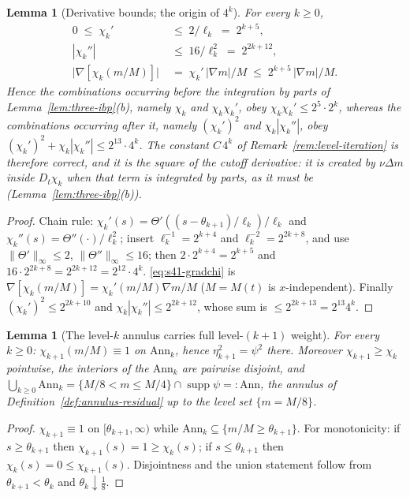 \documentclass[11pt]{article}
\newtheorem{lemma}[theorem]{Lemma}
\theoremstyle{definition}
\theoremstyle{remark}
\begin{document}
\begin{lemma}[Derivative bounds; the origin of $4^{k}$]\label{lem:s41-derivs}
  For every $k\geq0$,
  \begin{align}
    0\;\leq\;\chi_k' &\;\leq\; 2/\ell_k \;=\; 2^{k+5},
      \label{eq:s41-chip}\\
    |\chi_k''| &\;\leq\; 16/\ell_k^2 \;=\; 2^{2k+12},
      \label{eq:s41-chipp}\\
    \bigl|\nabla[\chi_k(m/M)]\bigr| &\;=\; \chi_k'\,|\nabla m|/M
      \;\leq\; 2^{k+5}\,|\nabla m|/M .
      \label{eq:s41-gradchi}
  \end{align}
  Hence the combinations occurring \emph{before} the integration by parts of
  Lemma~\ref{lem:three-ibp}(b), namely $\chi_k$ and $\chi_k\chi_k'$, obey
  $\chi_k\chi_k'\leq 2^{5}\cdot2^{k}$, whereas the combinations occurring
  \emph{after} it, namely $(\chi_k')^2$ and $\chi_k|\chi_k''|$, obey
  $(\chi_k')^2+\chi_k|\chi_k''|\leq 2^{13}\cdot4^{k}$. The constant
  $C\,4^{k}$ of Remark~\ref{rem:level-iteration} is therefore correct, and
  it is the \emph{square} of the cutoff derivative: it is created by
  $\nu\Delta m$ inside $D_t\chi_k$ when that term is integrated by parts, as
  it must be (Lemma~\ref{lem:three-ibp}(b)).
\end{lemma}
\begin{proof}
  Chain rule: $\chi_k'(s)=\Theta'((s-\theta_{k+1})/\ell_k)/\ell_k$ and
  $\chi_k''(s)=\Theta''(\cdot)/\ell_k^2$; insert
  $\ell_k^{-1}=2^{k+4}$ and $\ell_k^{-2}=2^{2k+8}$, and use
  $\|\Theta'\|_\infty\leq2$, $\|\Theta''\|_\infty\leq16$; then
  $2\cdot2^{k+4}=2^{k+5}$ and $16\cdot 2^{2k+8}=2^{2k+12}=2^{12}\cdot4^{k}$.
  \eqref{eq:s41-gradchi} is $\nabla[\chi_k(m/M)]=\chi_k'(m/M)\nabla m/M$
  ($M=M(t)$ is $x$-independent). Finally
  $(\chi_k')^2\leq2^{2k+10}$ and $\chi_k|\chi_k''|\leq2^{2k+12}$, whose sum
  is $\leq2^{2k+13}=2^{13}4^{k}$.
\end{proof}

\begin{lemma}[The level-$k$ annulus carries full level-$(k+1)$ weight]
  \label{lem:s41-fullweight}
  For every $k\geq0$: $\chi_{k+1}(m/M)\equiv1$ on $\mathrm{Ann}_k$, hence
  $\eta_{k+1}^2=\psi^2$ there. Moreover $\chi_{k+1}\geq\chi_k$ pointwise, the
  interiors of the $\mathrm{Ann}_k$ are pairwise disjoint, and
  $\bigcup_{k\geq0}\mathrm{Ann}_k
   =\{M/8<m\leq M/4\}\cap\operatorname{supp}\psi=:\mathrm{Ann}$,
  the annulus of Definition~\ref{def:annulus-residual} up to the level set
  $\{m=M/8\}$.
\end{lemma}
\begin{proof}
  $\chi_{k+1}\equiv1$ on $[\theta_{k+1},\infty)$ while
  $\mathrm{Ann}_k\subseteq\{m/M\geq\theta_{k+1}\}$. For monotonicity: if
  $s\geq\theta_{k+1}$ then $\chi_{k+1}(s)=1\geq\chi_k(s)$; if
  $s\leq\theta_{k+1}$ then $\chi_k(s)=0\leq\chi_{k+1}(s)$. Disjointness and
  the union statement follow from $\theta_{k+1}<\theta_k$ and
  $\theta_k\downarrow\tfrac18$.
\end{proof}
\end{document}
